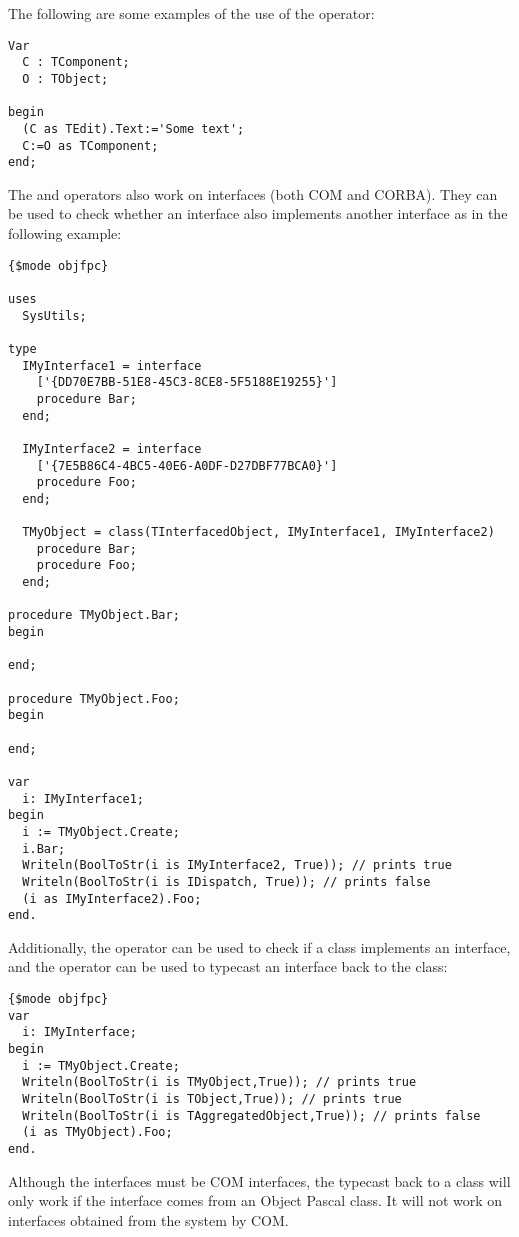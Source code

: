 The following are some examples of the use of the  operator:
\begin{verbatim}
Var
  C : TComponent;
  O : TObject;

begin
  (C as TEdit).Text:='Some text';
  C:=O as TComponent;
end;
\end{verbatim}

The  and  operators also work on interfaces (both COM and
CORBA). They can be used to check whether an interface also implements another interface as in
the following example:
\begin{verbatim}
{$mode objfpc}

uses
  SysUtils;

type
  IMyInterface1 = interface
    ['{DD70E7BB-51E8-45C3-8CE8-5F5188E19255}']
    procedure Bar;
  end;

  IMyInterface2 = interface
    ['{7E5B86C4-4BC5-40E6-A0DF-D27DBF77BCA0}']
    procedure Foo;
  end;

  TMyObject = class(TInterfacedObject, IMyInterface1, IMyInterface2)
    procedure Bar;
    procedure Foo;
  end;

procedure TMyObject.Bar;
begin

end;

procedure TMyObject.Foo;
begin

end;

var
  i: IMyInterface1;
begin
  i := TMyObject.Create;
  i.Bar;
  Writeln(BoolToStr(i is IMyInterface2, True)); // prints true
  Writeln(BoolToStr(i is IDispatch, True)); // prints false
  (i as IMyInterface2).Foo;
end.
\end{verbatim}

Additionally, the  operator can be used to check if a class
implements an interface, and the  operator can be used to typecast an
interface back to the class:
\begin{verbatim}
{$mode objfpc}
var
  i: IMyInterface;
begin
  i := TMyObject.Create;
  Writeln(BoolToStr(i is TMyObject,True)); // prints true
  Writeln(BoolToStr(i is TObject,True)); // prints true
  Writeln(BoolToStr(i is TAggregatedObject,True)); // prints false
  (i as TMyObject).Foo;
end.
\end{verbatim}
Although the interfaces must be COM interfaces, the typecast back to a
class will only work if the interface comes from an Object Pascal class.
It will not work on interfaces obtained from the system by COM.

